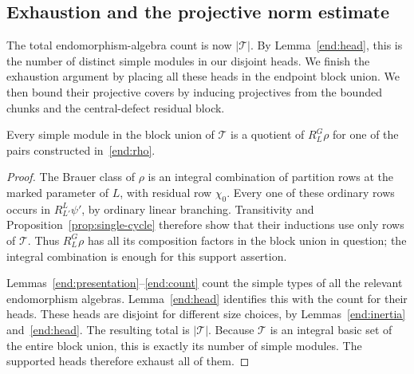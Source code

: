 \subsection{Exhaustion and the projective norm estimate}

The total endomorphism-algebra count is now $|\mathcal T|$.
By Lemma~\ref{end:head}, this is the number of distinct simple
modules in our disjoint heads.  We finish the exhaustion argument
by placing all these heads in the endpoint block union.  We then
bound their projective covers by inducing projectives from the
bounded chunks and the central-defect residual block.

\begin{corollary}
\label{end:exhaustion}
Every simple module in the block union of $\mathcal T$
is a quotient of $R_L^G\rho$ for one of the pairs
constructed in~\eqref{end:rho}.
\end{corollary}

\begin{proof}
The Brauer class of $\rho$ is an integral combination of
partition rows at the marked parameter of $L$, with
residual row $\chi_0$.  Every one of these ordinary rows
occurs in $R_{L'}^L\psi'$, by ordinary linear branching.
Transitivity and Proposition~\ref{prop:single-cycle}
therefore show that their inductions use only rows of
$\mathcal T$.  Thus $R_L^G\rho$ has all its composition
factors in the block union in question; the integral
combination is enough for this support assertion.

Lemmas~\ref{end:presentation}--\ref{end:count} count the
simple types of all the relevant endomorphism algebras.
Lemma~\ref{end:head} identifies this with the count for their heads.
These heads are disjoint for different size choices, by
Lemmas~\ref{end:inertia} and~\ref{end:head}.  The resulting total is
$|\mathcal T|$.  Because $\mathcal T$ is an integral
basic set of the entire block union, this is exactly its
number of simple modules.  The supported heads therefore
exhaust all of them.
\end{proof}

